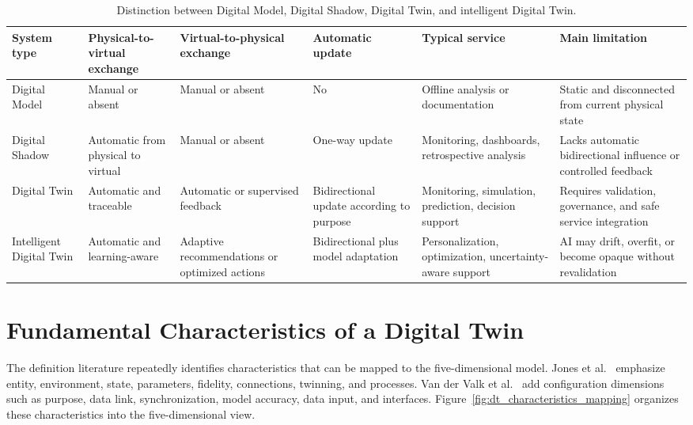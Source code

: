 \begin{table}[H]
\centering
\scriptsize
\caption{Distinction between Digital Model, Digital Shadow, Digital Twin, and intelligent Digital Twin.}
\label{tab:model_shadow_twin}
\begin{tabularx}{\textwidth}{>{\RaggedRight\arraybackslash}p{2.35cm} >{\RaggedRight\arraybackslash}p{2.45cm} >{\RaggedRight\arraybackslash}p{2.45cm} >{\RaggedRight\arraybackslash}p{2.15cm} >{\RaggedRight\arraybackslash}p{2.6cm} >{\RaggedRight\arraybackslash}X}
\toprule
\textbf{System type} & \textbf{Physical-to-virtual exchange} & \textbf{Virtual-to-physical exchange} & \textbf{Automatic update} & \textbf{Typical service} & \textbf{Main limitation}\\
\midrule
Digital Model & Manual or absent & Manual or absent & No & Offline analysis or documentation & Static and disconnected from current physical state\\
Digital Shadow & Automatic from physical to virtual & Manual or absent & One-way update & Monitoring, dashboards, retrospective analysis & Lacks automatic bidirectional influence or controlled feedback\\
Digital Twin & Automatic and traceable & Automatic or supervised feedback & Bidirectional update according to purpose & Monitoring, simulation, prediction, decision support & Requires validation, governance, and safe service integration\\
Intelligent Digital Twin & Automatic and learning-aware & Adaptive recommendations or optimized actions & Bidirectional plus model adaptation & Personalization, optimization, uncertainty-aware support & AI may drift, overfit, or become opaque without revalidation\\
\bottomrule
\end{tabularx}
\end{table}

\section{Fundamental Characteristics of a Digital Twin}
The definition literature repeatedly identifies characteristics that can be mapped to the five-dimensional model. Jones et al.~\cite{jones2020characterising} emphasize entity, environment, state, parameters, fidelity, connections, twinning, and processes. Van der Valk et al.~\cite{vanderValk2020taxonomy,vanderValk2021archetypes} add configuration dimensions such as purpose, data link, synchronization, model accuracy, data input, and interfaces. Figure~\ref{fig:dt_characteristics_mapping} organizes these characteristics into the five-dimensional view.


